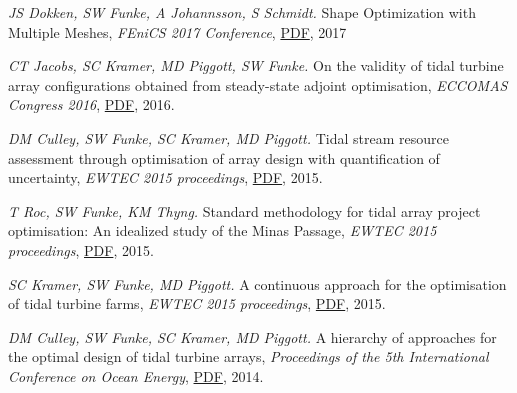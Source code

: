 \documentclass[11pt]{article}
\begin{document}
\begin{etaremune}
    \item \textit{JS Dokken, SW Funke, A Johannsson, S Schmidt.} Shape Optimization with Multiple Meshes, \textit{FEniCS 2017 Conference}, \href{https://github.com/funsim/cv/raw/master/publications/fenics_2017_proceedings.pdf}{PDF}, 2017
    \item \textit{CT Jacobs, SC Kramer, MD Piggott, SW Funke.} On the validity of tidal turbine array configurations obtained from steady-state adjoint optimisation, \textit{ECCOMAS Congress 2016}, \href{https://github.com/funsim/cv/raw/master/publications/jacobs_eccomas_2016.pdf}{PDF}, 2016.
    \item \textit{DM Culley, SW Funke, SC Kramer, MD Piggott.} Tidal stream resource assessment through optimisation of array design with quantification of uncertainty, \textit{EWTEC 2015 proceedings}, \href{https://github.com/funsim/cv/raw/master/publications/culley_ewtec_2015.pdf}{PDF}, 2015.
    \item \textit{T Roc, SW Funke, KM Thyng.} Standard methodology for tidal array project optimisation: An idealized study of the Minas Passage, \textit{EWTEC 2015 proceedings}, \href{https://github.com/funsim/cv/raw/master/publications/roc_ewtec_2015.pdf}{PDF}, 2015.
    \item \textit{SC Kramer, SW Funke, MD Piggott.} A continuous approach for the optimisation of tidal turbine farms, \textit{EWTEC 2015 proceedings}, \href{https://github.com/funsim/cv/raw/master/publications/kramer_ewtec_2015.pdf}{PDF}, 2015.
    \item \textit{DM Culley, SW Funke, SC Kramer, MD Piggott.} A hierarchy of approaches for the optimal design of tidal turbine arrays, \textit{Proceedings of the 5th International Conference on Ocean Energy}, \href{https://github.com/funsim/cv/raw/master/publications/culley_ewtec_2015.pdf}{PDF}, 2014.
\end{etaremune}

\end{document}
